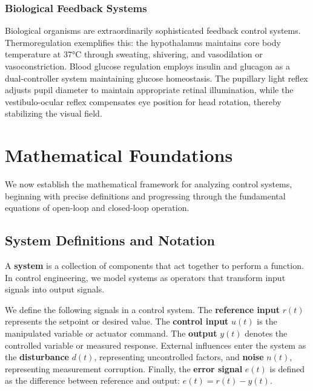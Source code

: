 \subsubsection{Biological Feedback Systems}
Biological organisms are extraordinarily sophisticated feedback control systems. Thermoregulation exemplifies this: the hypothalamus maintains core body temperature at 37°C through sweating, shivering, and vasodilation or vasoconstriction. Blood glucose regulation employs insulin and glucagon as a dual-controller system maintaining glucose homeostasis. The pupillary light reflex adjusts pupil diameter to maintain appropriate retinal illumination, while the vestibulo-ocular reflex compensates eye position for head rotation, thereby stabilizing the visual field.

\section{Mathematical Foundations}
\label{sec:math_foundations}

We now establish the mathematical framework for analyzing control systems, beginning with precise definitions and progressing through the fundamental equations of open-loop and closed-loop operation.

\subsection{System Definitions and Notation}

\begin{definition}[System]
A \textbf{system} is a collection of components that act together to perform a function. In control engineering, we model systems as operators that transform input signals into output signals.
\end{definition}

\begin{definition}[Signals]
We define the following signals in a control system. The \textbf{reference input} $r(t)$ represents the setpoint or desired value. The \textbf{control input} $u(t)$ is the manipulated variable or actuator command. The \textbf{output} $y(t)$ denotes the controlled variable or measured response. External influences enter the system as the \textbf{disturbance} $d(t)$, representing uncontrolled factors, and \textbf{noise} $n(t)$, representing measurement corruption. Finally, the \textbf{error signal} $e(t)$ is defined as the difference between reference and output: $e(t) = r(t) - y(t)$.
\end{definition}

